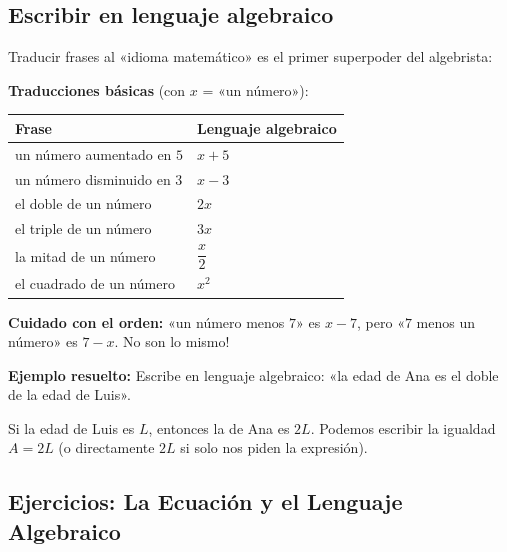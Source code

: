 \documentclass[12pt, letterpaper]{article}
\begin{document}
\newpage

\subsection{Escribir en lenguaje algebraico}

Traducir frases al «idioma matemático» es el primer superpoder del algebrista:

\begin{cuadrosolucion}
  \textbf{Traducciones básicas} (con $x$ = «un número»):
  \begin{center}
    \begin{tabular}{ll}
      \textbf{Frase}              & \textbf{Lenguaje algebraico} \\ \hline
      un número aumentado en $5$  & $x + 5$                      \\
      un número disminuido en $3$ & $x - 3$                      \\
      el doble de un número       & $2x$                         \\
      el triple de un número      & $3x$                         \\
      la mitad de un número       & $\dfrac{x}{2}$               \\
      el cuadrado de un número    & $x^2$                        \\
    \end{tabular}
  \end{center}
\end{cuadrosolucion}

\begin{cuadroadvertencia}
  \textbf{Cuidado con el orden:} «un número menos $7$» es $x - 7$, pero «$7$ menos un número» es $7 - x$. \textquestiondown No son lo mismo!
\end{cuadroadvertencia}

\noindent\textbf{Ejemplo resuelto:} Escribe en lenguaje algebraico: «la edad de Ana es el doble de la edad de Luis».

Si la edad de Luis es $L$, entonces la de Ana es $2L$. Podemos escribir la igualdad $A = 2L$ (o directamente $2L$ si solo nos piden la expresión).

\subsection{Ejercicios: La Ecuación y el Lenguaje Algebraico}
\end{document}
